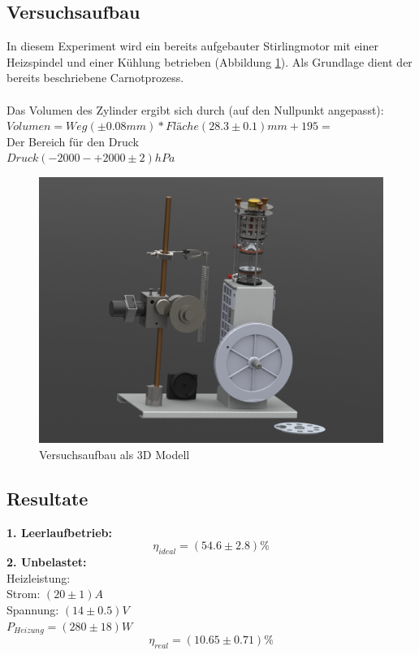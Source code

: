 \documentclass[12pt,a4paper]{article}
\begin{document}
\begin{multicols}{2}
\subsection{Versuchsaufbau}
In diesem Experiment wird ein bereits aufgebauter Stirlingmotor mit einer Heizspindel und einer Kühlung betrieben (Abbildung  \ref{fig:stirlingMotor_3D}). Als Grundlage dient der bereits beschriebene Carnotprozess. \\
\\
Das Volumen des Zylinder ergibt sich durch (auf den Nullpunkt angepasst):\\
$Volumen = Weg (\pm 0.08mm) * Fläche (28.3 \pm 0.1)mm + 195 = $\\ %
Der Bereich für den Druck\\
$Druck (-2000 - +2000 \pm 2) hPa$\\

\begin{figure}[H]
	\centering
	\includegraphics[scale=0.25]{./data/3D-Model/PS9-model_neutral01.JPG}
	\caption{Versuchsaufbau als 3D Modell}
	\label{fig:stirlingMotor_3D}
\end{figure}



\subsection{Resultate}
\textbf{1. Leerlaufbetrieb:}\\
$$\eta_{ideal}=(54.6 \pm 2.8)\%$$
\textbf{2. Unbelastet:}\\
Heizleistung:\\
Strom: $(20 \pm 1) A$\\
Spannung: $(14 \pm 0.5) V$\\
$P_{Heizung}=(280 \pm 18)W$\\
$$\eta_{real}=(10.65 \pm 0.71)\%$$\\


\end{multicols}
\end{document}
